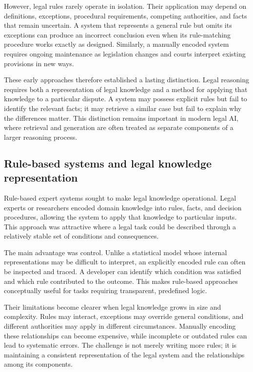 However, legal rules rarely operate in isolation. Their application may depend on definitions,
exceptions, procedural requirements, competing authorities, and facts that remain uncertain. A
system that represents a general rule but omits its exceptions can produce an incorrect conclusion
even when its rule-matching procedure works exactly as designed. Similarly, a manually encoded
system requires ongoing maintenance as legislation changes and courts interpret existing provisions
in new ways.

These early approaches therefore established a lasting distinction. Legal reasoning requires both a
representation of legal knowledge and a method for applying that knowledge to a particular dispute.
A system may possess explicit rules but fail to identify the relevant facts; it may retrieve a
similar case but fail to explain why the differences matter. This distinction remains important in
modern legal AI, where retrieval and generation are often treated as separate components of a
larger reasoning process.

\subsection{Rule-based systems and legal knowledge representation}

Rule-based expert systems sought to make legal knowledge operational. Legal experts or researchers
encoded domain knowledge into rules, facts, and decision procedures, allowing the system to apply
that knowledge to particular inputs. This approach was attractive where a legal task could be
described through a relatively stable set of conditions and consequences.

The main advantage was control. Unlike a statistical model whose internal representations may be
difficult to interpret, an explicitly encoded rule can often be inspected and traced. A developer
can identify which condition was satisfied and which rule contributed to the outcome. This makes
rule-based approaches conceptually useful for tasks requiring transparent, predefined logic.

Their limitations become clearer when legal knowledge grows in size and complexity. Rules may
interact, exceptions may override general conditions, and different authorities may apply in
different circumstances. Manually encoding these relationships can become expensive, while
incomplete or outdated rules can lead to systematic errors. The challenge is not merely writing
more rules; it is maintaining a consistent representation of the legal system and the relationships
among its components.

